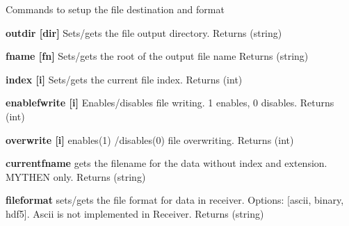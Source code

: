 Commands to setup the file destination and format


\begin{DoxyItemize}
\item {\bfseries outdir \mbox{[}dir\mbox{]}} Sets/gets the file output directory. {\ttfamily Returns} {\ttfamily }(string)
\end{DoxyItemize}


\begin{DoxyItemize}
\item {\bfseries fname \mbox{[}fn\mbox{]}} Sets/gets the root of the output file name {\ttfamily Returns} {\ttfamily }(string)
\end{DoxyItemize}


\begin{DoxyItemize}
\item {\bfseries index \mbox{[}i\mbox{]}} Sets/gets the current file index. {\ttfamily Returns} {\ttfamily }(int)
\end{DoxyItemize}


\begin{DoxyItemize}
\item {\bfseries enablefwrite \mbox{[}i\mbox{]}} Enables/disables file writing. 1 enables, 0 disables. {\ttfamily Returns} {\ttfamily }(int)
\end{DoxyItemize}


\begin{DoxyItemize}
\item {\bfseries overwrite \mbox{[}i\mbox{]}} enables(1) /disables(0) file overwriting. {\ttfamily Returns} {\ttfamily }(int)
\end{DoxyItemize}


\begin{DoxyItemize}
\item {\bfseries currentfname} gets the filename for the data without index and extension. MYTHEN only. {\ttfamily Returns} {\ttfamily }(string)
\end{DoxyItemize}


\begin{DoxyItemize}
\item {\bfseries fileformat} sets/gets the file format for data in receiver. Options: \mbox{[}ascii, binary, hdf5\mbox{]}. Ascii is not implemented in Receiver. {\ttfamily Returns} {\ttfamily }(string) 
\end{DoxyItemize}
